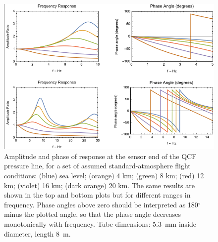 \documentclass[12pt,twoside,english]{article}\usepackage[]{graphicx}\usepackage[]{color}
\begin{document}
\begin{figure}
\noindent \begin{centering}
\includegraphics[height=0.4\textheight]{PressureLines1.png}  
\par\end{centering}

\protect\caption[Amplitude ratio and phase for transmission through the QCF pressure line.]{\label{fig:AppxB-DHL1}Amplitude and phase of response at the sensor end of the QCF pressure line, for a set of assumed standard-atmosphere flight conditions: (blue) sea level; (orange) 4 km; (green) 8 km; (red) 12 km; (violet) 16 km; (dark orange) 20 km. The same results are shown in the top and bottom plots but for different ranges in frequency. Phase angles above zero should be interpreted as 180$^{\circ}$ minus the plotted angle, so that the phase angle decreases monotonically with frequency. Tube dimensions: 5.3~mm inside diameter, length 8~m. } 
\end{figure}
\end{document}
